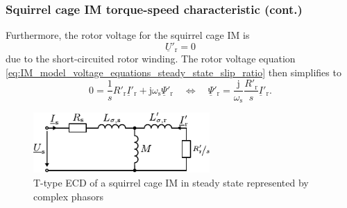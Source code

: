 \begin{frame}
	\frametitle{Squirrel cage IM torque-speed characteristic (cont.)} 
     Furthermore, the rotor voltage for the squirrel cage IM is
     $$
        \underline{U}'_\mathrm{r} = 0
    $$
    due to the short-circuited rotor winding. The rotor voltage equation \eqref{eq:IM_model_voltage_equations_steady_state_slip_ratio} then simplifies to
    \begin{equation}
        0 = \frac{1}{s}R'_\mathrm{r}\underline{I}'_\mathrm{r}+\mathrm{j}\omega_\mathrm{s}\underline{\Psi}'_\mathrm{r} \quad \Leftrightarrow \quad \underline{\Psi}'_\mathrm{r} = \frac{\mathrm{j}}{\omega_\mathrm{s}}\frac{R'_\mathrm{r}}{s}\underline{I}'_\mathrm{r}. 
        \label{eq:IM_model_rotor_flux_steady_state}
    \end{equation}
    \begin{figure}
        \centering
        \includegraphics[width=0.6\textwidth]{fig/lec06/IM_squirrel_T_ECD_steady_state.pdf}
        \caption{T-type ECD of a squirrel cage IM in steady state represented by complex phasors}
        \label{fig:IM_squirrel_T_ECD_steady_state}
    \end{figure}
\end{frame}

